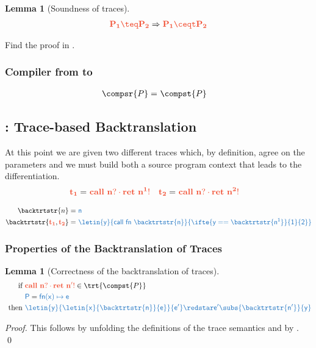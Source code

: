 \documentclass{article}
\newtheorem{lemma}[theorem]{Lemma}
\theoremstyle{definition}
\begin{document}
\begin{lemma}[Soundness of traces]\label{thm:sound-traces}
	\begin{align*}
		\trg{P_1\teq P_2}\Rightarrow\trg{P_1\ceqt P_2}
	\end{align*}
\end{lemma}
Find the proof in .

\subsubsection{Compiler from \So to \Tr}
\begin{align*}
	\compsr{P} =&\ \compst{P}
\end{align*}


\subsection{\backtrtstr{\cdot}: Trace-based Backtranslation}
At this point we are given two different traces which, by definition, agree on the  parameters and we must build both a source program context \src{\ctx} that leads to the differentiation.
\begin{align*}
	\trg{t_1} =&\ \trg{call~n? \cdot ret~n^1!}
	&
	\trg{t_2} =&\ \trg{call~n? \cdot ret~n^2!}
\end{align*}

\begin{align*}
	\backtrtstr{n} =&\ 
		\src{n}
	\\
	\backtrtstr{\trg{t_1},\trg{t_2}} =&\
	\src{
		\letin{y}{call~fn~\backtrtstr{n}}{ \ifte{y == \backtrtstr{n^1}}{1}{2} }
		}
\end{align*}

\subsubsection{Properties of the Backtranslation of Traces}
\begin{lemma}[Correctness of the backtranslation of traces]\label{thm:trace-backtr-corr}
	\begin{align*}
		\text{ if }
		&
		\trg{call~n? \cdot ret~n'!} \in \trt{\compst{P}}
		\\
		&
		\src{P} = \src{fn(x)\mapsto e}
		\\
		\text{ then }
		&
		\src{\letin{y}{\letin{x}{\backtrtstr{n}}{e}}{e'} \redstar e'\subs{\backtrtstr{n'}}{y} }
	\end{align*}
\end{lemma}
\begin{proof}
	This follows by unfolding the definitions of the trace semantics and by .
	\qed
\end{proof}
\end{document}
